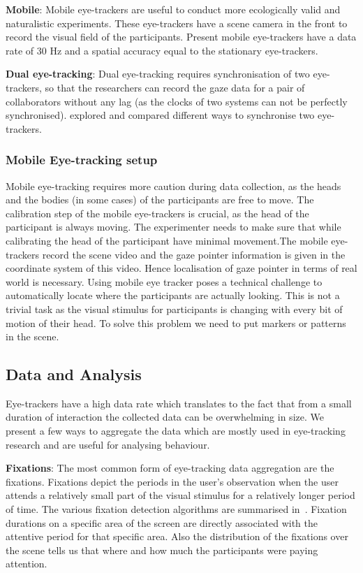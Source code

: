 \documentclass{sig-alternate}
\begin{document}
\textbf {Mobile}: Mobile eye-trackers are useful to conduct more ecologically valid and naturalistic experiments. These eye-trackers have a scene camera in the front to record the visual field of the participants. Present mobile eye-trackers have a data rate of 30 Hz and a spatial accuracy equal to the stationary eye-trackers.

 \textbf {Dual eye-tracking}: Dual eye-tracking requires synchronisation of two eye-trackers, so that the researchers can record the gaze data for a pair of collaborators without any lag (as the clocks of two systems can not be perfectly synchronised). \cite{nussli2011dual} explored and compared different ways to synchronise two eye-trackers.




\subsubsection{Mobile Eye-tracking setup}

Mobile eye-tracking requires more caution during data collection, as the heads and the bodies (in some cases) of the participants are free to move. The calibration step of the mobile eye-trackers is crucial, as the head of the participant is always moving. The experimenter needs to make sure that while calibrating the head of the participant have minimal movement.The mobile eye-trackers record the scene video and the gaze pointer information is given in the coordinate system of this video. Hence localisation of gaze pointer in terms of real world is necessary. Using mobile eye tracker poses a technical challenge to automatically locate where the participants are actually looking. This is not a trivial task as the visual stimulus for participants is changing with every bit of motion of their head. To solve this problem we need to put markers or patterns in the scene.


\subsection{Data and Analysis}

Eye-trackers have a high data rate which translates to the fact that from a small duration of interaction the collected data can be  overwhelming in size. We present a few ways to aggregate the data which are mostly used in eye-tracking research and are useful for analysing behaviour.


 \textbf {Fixations}: The most common form of eye-tracking data aggregation are the fixations. Fixations depict the periods in the user's observation when the user attends a relatively small part of the visual stimulus for a relatively longer period of time. The various fixation detection algorithms are summarised in~\cite{duchowski2007eye}.  Fixation durations on a specific area of the screen are directly associated with the attentive period for that specific area. Also the distribution of the fixations over the scene tells us that where and how much the participants were paying attention.
 
\end{document}
